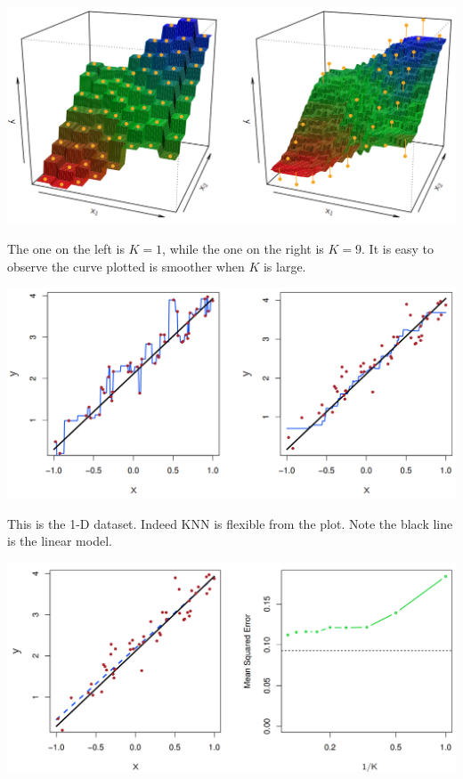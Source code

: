 \documentclass{article}
\theoremstyle{MyNonumberplain}
\theoremstyle{break}
\theoremstyle{break}
\theoremstyle{break}
\theoremstyle{break}
\begin{document}
\begin{center}
    \includegraphics*[scale=0.4]{Images/img14.png}
\end{center}

The one on the left is $K=1$, while the one on the right is $K=9$. It is easy to observe the curve plotted is smoother when $K$ is large.

\begin{center}
    \includegraphics*[scale=0.4]{Images/img15.png}
\end{center}

This is the 1-D dataset. Indeed KNN is flexible from the plot. Note the black line is the linear model.

\begin{center}
    \includegraphics*[scale=0.2]{Images/img16.png}
\end{center}
\end{document}

